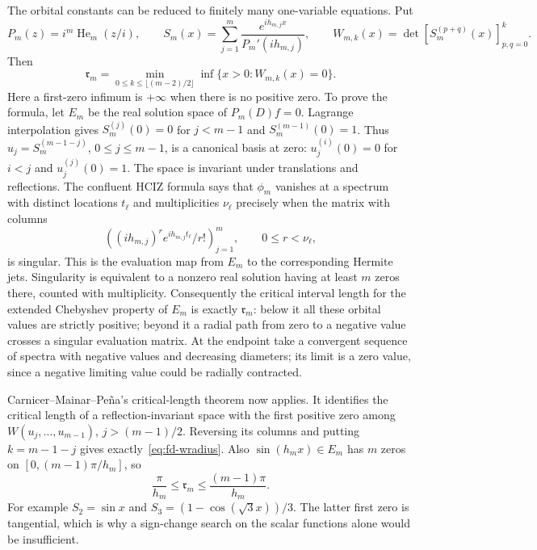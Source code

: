 The orbital constants can be reduced to finitely many one-variable equations.
Put
\[
 P_m(z)=i^m\operatorname{He}_m(z/i),\qquad
 S_m(x)=\sum_{j=1}^m\frac{e^{ih_{m,j}x}}{P_m'(ih_{m,j})},
 \qquad
 W_{m,k}(x)=\det[S_m^{(p+q)}(x)]_{p,q=0}^k.
\]
Then
\begin{equation}\label{eq:fd-wradius}
 \mathfrak r_m=
 \min_{0\le k\le\lfloor(m-2)/2\rfloor}
        \inf\{x>0:W_{m,k}(x)=0\}.
\end{equation}
Here a first-zero infimum is $+\infty$ when there is no positive zero.
To prove the formula, let $E_m$ be the real solution space of
$P_m(D)f=0$.  Lagrange interpolation gives
$S_m^{(j)}(0)=0$ for $j<m-1$ and $S_m^{(m-1)}(0)=1$.
Thus $u_j=S_m^{(m-1-j)}$, $0\le j\le m-1$, is a canonical basis
at zero: $u_j^{(i)}(0)=0$ for $i<j$ and $u_j^{(j)}(0)=1$.
The space is invariant under translations and reflections.
The confluent HCIZ formula says that $\phi_m$ vanishes at a spectrum
with distinct locations $t_\ell$ and multiplicities $\nu_\ell$ precisely
when the matrix with columns
\[
 \left((ih_{m,j})^r e^{ih_{m,j}t_\ell}/r!\right)_{j=1}^m,
 \qquad 0\le r<\nu_\ell,
\]
is singular.  This is the evaluation map from $E_m$ to the corresponding
Hermite jets.  Singularity is equivalent to a nonzero real solution
having at least $m$ zeros there, counted with multiplicity.
Consequently the critical interval length for the extended Chebyshev
property of $E_m$ is exactly $\mathfrak r_m$: below it all these
orbital values are strictly positive; beyond it a radial path from
zero to a negative value crosses a singular evaluation matrix.
At the endpoint take a convergent sequence of spectra with negative
values and decreasing diameters; its limit is a zero value, since a
negative limiting value could be radially contracted.

Carnicer--Mainar--Pe\~na's critical-length theorem
\cite[Section~3, Proposition~3, p.~6]{Carnicer2023} now applies.
It identifies the critical length of a reflection-invariant space with
the first positive zero among $W(u_j,\ldots,u_{m-1})$,
$j>(m-1)/2$.  Reversing its columns and putting $k=m-1-j$
gives exactly~\eqref{eq:fd-wradius}.
Also $\sin(h_mx)\in E_m$ has $m$ zeros on
$[0,(m-1)\pi/h_m]$, so
\[
 \frac\pi{h_m}\le\mathfrak r_m\le\frac{(m-1)\pi}{h_m}.
\]
For example $S_2=\sin x$ and
$S_3=(1-\cos(\sqrt3x))/3$.  The latter first zero is tangential,
which is why a sign-change search on the scalar functions alone
would be insufficient.

